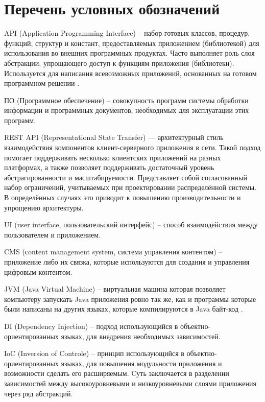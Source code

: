 \section*{Перечень условных обозначений}\label{sec:glossary}\indent

\hypertarget{gloss:api}{
    API (Application Programming Interface) – набор готовых классов, процедур, функций, структур и констант, предоставляемых приложением (библиотекой) для использования во внешних программных продуктах. 
    Часто выполняет роль слоя абстракции, упрощающего доступ к функциям приложения (библиотеки). 
    Используется для написания всевозможных приложений, основанных на готовом программном решении \cite{api}.
}

\hypertarget{gloss:software}{
    ПО (Программное обеспечение) – совокупность программ системы обработки информации и программных документов, необходимых для эксплуатации этих программ.
}

\hypertarget{gloss:rest}{
    REST API (Representational State Transfer) --– архитектурный стиль взаимодействия компонентов клиент-серверного приложения в сети.
    Такой подход помогает поддерживать несколько клиентских приложений на разных платформах, а также позволяет поддерживать достаточный уровень абстрагированности и масштабируемости.
    Представляет собой согласованный набор ограничений, учитываемых при проектировании распределённой системы.
    В определённых случаях это приводит к повышению производительности и упрощению архитектуры.
}

\hypertarget{gloss:ui}{
    UI (user interface, пользовательский интерфейс) – способ взаимодействия между пользователем и приложением.
}

\hypertarget{gloss:cms}{
    CMS (сontent management system, система управления контентом) – приложение либо их связка, которые используются для создания и управления цифровым контентом.
}

\hypertarget{gloss:jvm}{
    JVM (Java Virtual Machine) – виртуальная машина которая позволяет компьютеру запускать Java приложения ровно так же, как и программы которые были написаны на других языках, которые компилируются в Java байт-код \cite{jvm}.
}

\hypertarget{gloss:di}{
    DI (Dependency Injection) – подход использующийся в объектно-ориентированных языках, для внедрения необходимых зависимостей.
}

\hypertarget{gloss:ioc}{
    IoC (Inversion of Controle) – принцип использующийся в объектно-ориентированных языках, для повышения модульности приложения и возможности сделать его расширяемым. 
    Cуть заключается в разделении зависимостей между высокоуровневыми и низкоуровневыми слоями приложения через ряд абстракций.
}

